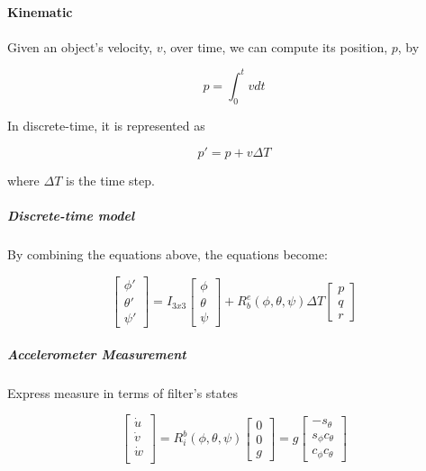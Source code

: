 \documentclass[]{article}
\begin{document}
\paragraph{Kinematic}

\paragraph*{}
Given an object's velocity, $v$, over time, we can compute its position, $p$, by

\begin{equation}
p = \int_0^t v dt
\end{equation}

In discrete-time, it is represented as

\begin{equation}
p' = p + v \Delta T
\end{equation}

where $\Delta T$ is the time step.


\subparagraph*{Discrete-time model}
By combining the equations above, the equations become:

\begin{equation}
	\begin{bmatrix}
		\phi' \\
		\theta' \\
		\psi'
	\end{bmatrix} = I_{3x3} 
	\begin{bmatrix}
		\phi \\
		\theta \\
		\psi
	\end{bmatrix} + 
	R_b^e(\phi, \theta, \psi)
	\Delta T
	\begin{bmatrix}
		p \\
		q \\
		r
	\end{bmatrix}
\end{equation}

\subparagraph{Accelerometer Measurement}
Express measure in terms of filter's states

\begin{equation}
	\begin{bmatrix}
		\dot{u} \\
		\dot{v} \\
		\dot{w} \\
	\end{bmatrix} = 
	R_{i}^{b}(\phi, \theta, \psi)
	\begin{bmatrix}
		0 \\
		0 \\
		g
	\end{bmatrix} = g
	\begin{bmatrix}
		-s_\theta \\
		s_\phi c_\theta \\
		c_\phi c_\theta
	\end{bmatrix}\label{eqn:accelerometer_measurement_equation}
\end{equation}
\end{document}
